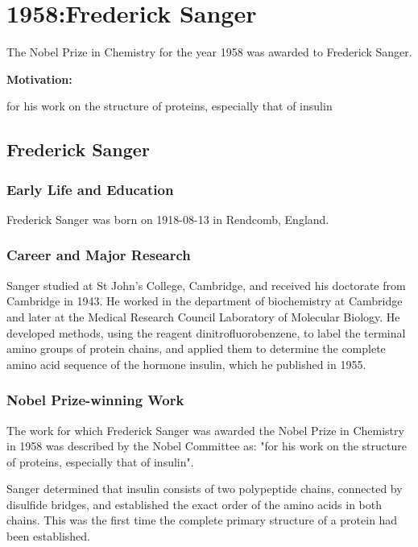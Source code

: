 \chapter{1958:Frederick Sanger}

\label{chap:chemistry1958}

The Nobel Prize in Chemistry for the year 1958 was awarded to Frederick Sanger.

\textbf{Motivation:}

for his work on the structure of proteins, especially that of insulin

\section{Frederick Sanger}

\subsection*{Early Life and Education}

Frederick Sanger was born on 1918-08-13 in Rendcomb, England.

\subsection*{Career and Major Research}

Sanger studied at St John's College, Cambridge, and received his doctorate from Cambridge in 1943. He worked in the department of biochemistry at Cambridge and later at the Medical Research Council Laboratory of Molecular Biology. He developed methods, using the reagent dinitrofluorobenzene, to label the terminal amino groups of protein chains, and applied them to determine the complete amino acid sequence of the hormone insulin, which he published in 1955.

\subsection*{Nobel Prize-winning Work}

The work for which Frederick Sanger was awarded the Nobel Prize in Chemistry in 1958 was described by the Nobel Committee as: "for his work on the structure of proteins, especially that of insulin".

Sanger determined that insulin consists of two polypeptide chains, connected by disulfide bridges, and established the exact order of the amino acids in both chains. This was the first time the complete primary structure of a protein had been established.

